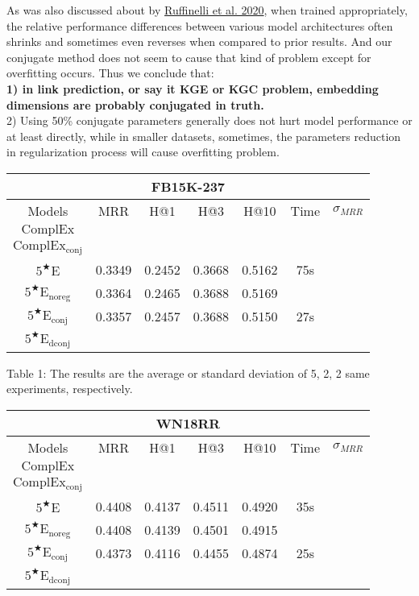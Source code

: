 \documentclass[9pt]{ctexart}
\theoremstyle{definition}
\begin{document}
As was also discussed about by \hyperlink{Ruf20}{Ruffinelli et al. 2020},
when trained appropriately, the relative performance differences between various model architectures often shrinks and sometimes even reverses when compared to prior results.
And our conjugate method does not seem to cause that kind of problem except for overfitting occurs.
Thus we conclude that:\\
\textbf{1) in link prediction, or say it KGE or KGC problem, embedding dimensions are probably conjugated in truth.}\\
2) Using 50\% conjugate parameters generally does not hurt model performance or at least directly, 
while in smaller datasets, sometimes, the parameters reduction in regularization process will cause overfitting problem.

\begin{center}
\begin{tabular}{ccccccc}
    \toprule
    \multicolumn{7}{c}{FB15K-237}\\
    \hline
    Models & MRR & H@1 & H@3 & H@10 & Time & $\sigma_{MRR}$\\
    \midrule
    $\mathrm{ComplEx}$\\
    $\mathrm{ComplEx_{conj}}$\\
    $5^{\bigstar}\mathrm{E}$ & 0.3349 & 0.2452 & 0.3668 & 0.5162 & 75s &\\
    $5^{\bigstar}\mathrm{E_{noreg}}$ & 0.3364 & 0.2465 & 0.3688 & 0.5169 && \\
    $5^{\bigstar}\mathrm{E_{conj}}$ & 0.3357 & 0.2457 & 0.3688 & 0.5150 & 27s &\\
    $5^{\bigstar}\mathrm{E_{dconj}}$ &&&&&&\\
    \bottomrule
\end{tabular}

Table 1: The results are the average or standard deviation of 5, 2, 2 same experiments, respectively.

\bigskip

\begin{tabular}{ccccccc}
    \toprule
    \multicolumn{7}{c}{WN18RR}\\
    \hline
    Models & MRR & H@1 & H@3 & H@10 & Time & $\sigma_{MRR}$\\
    \midrule
    $\mathrm{ComplEx}$\\
    $\mathrm{ComplEx_{conj}}$\\
    $5^{\bigstar}\mathrm{E}$ & 0.4408 & 0.4137 & 0.4511 & 0.4920 & 35s\\
    $5^{\bigstar}\mathrm{E_{noreg}}$ & 0.4408 & 0.4139 & 0.4501 & 0.4915 & \\
    $5^{\bigstar}\mathrm{E_{conj}}$ & 0.4373 & 0.4116 & 0.4455 & 0.4874 & 25s\\
    $5^{\bigstar}\mathrm{E_{dconj}}$ &&&&&&\\
    \bottomrule
\end{tabular}


\end{center}
\end{document}
